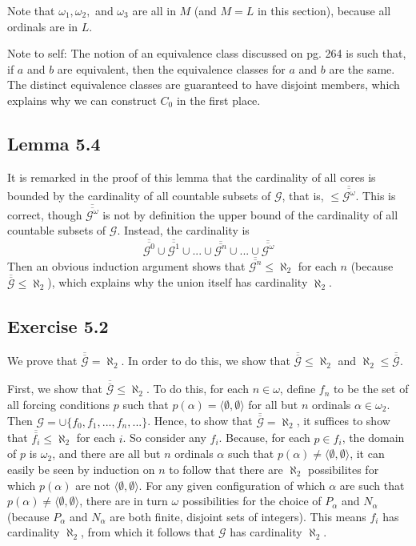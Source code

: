 \documentclass{article}
\theoremstyle{definition}
\begin{document}
Note that $\omega_1,\omega_2,$ and $\omega_3$ are all in $M$ (and $M=L$ in this section), because all ordinals are in 
$L$.

Note to self: The notion of an equivalence class discussed on pg. 264 is such that, if $a$ and $b$ are equivalent, then 
the equivalence classes for $a$ and $b$ are the same. The distinct equivalence classes are guaranteed to have disjoint members, which explains 
why we can construct $C_0$ in the first place.

\subsection*{Lemma 5.4}
It is remarked in the proof of this lemma that the cardinality of all cores is bounded by the cardinality of all countable 
subsets of $\mathcal{G}$, that is, $\le\overline{\overline{\mathcal{G}^\omega}}$. This is correct, though 
$\overline{\overline{\mathcal{G}^\omega}}$ is not by definition the upper bound of the cardinality of all countable subsets of 
$\mathcal{G}$. Instead, the cardinality is
\[ \overline{\overline{\mathcal{G}^0}}\cup\overline{\overline{\mathcal{G}^1}}\cup 
...\cup\overline{\overline{\mathcal{G}^n}}\cup ...\cup\overline{\overline{\mathcal{G}^\omega}} \]
Then an obvious induction argument shows that $\overline{\overline{\mathcal{G}^n}}\le\aleph_2$ for each $n$ (because 
$\overline{\overline{\mathcal{G}}}\le\aleph_2$), which explains why the union itself has cardinality
$\aleph_2$.

\subsection*{Exercise 5.2}
We prove that $\overline{\overline{\mathcal{G}}}=\aleph_2$. In order to do this, we show that 
$\overline{\overline{\mathcal{G}}}\le\aleph_2$ and $\aleph_2\le\overline{\overline{\mathcal{G}}}$. 

First, we show that $\overline{\overline{\mathcal{G}}}\le\aleph_2$. To do this, for each $n\in\omega$, 
define $f_n$ to be the set of all forcing conditions 
$p$ such that $p(\alpha)=\langle\emptyset,\emptyset\rangle$ for all but $n$ ordinals $\alpha\in\omega_2$. Then 
$\mathcal{G}=\cup\{f_0,f_1,...,f_n,...\}$. Hence, to show that $\overline{\overline{\mathcal{G}}}=\aleph_2$, it suffices to show that 
$\overline{\overline{f_i}}\le\aleph_2$ for each $i$. So consider any $f_i$. Because, for each $p\in f_i$, the domain of 
$p$ is $\omega_2$, and there are all but $n$ ordinals $\alpha$ such that $p(\alpha)\ne\langle\emptyset,\emptyset\rangle$, it can easily be seen 
by induction on $n$ to follow that there are $\aleph_2$ possibilites for which $p(\alpha)$ are not $\langle\emptyset,\emptyset\rangle$. 
For any given configuration of which $\alpha$ are such that $p(\alpha)\ne\langle\emptyset,\emptyset\rangle$, there are 
in turn $\omega$ possibilities for the choice of $P_\alpha$ and $N_\alpha$ (because $P_\alpha$ and $N_\alpha$ are both 
finite, disjoint sets of integers). This means $f_i$ has cardinality $\aleph_2$, from which it follows that 
$\mathcal{G}$ has cardinality $\aleph_2$.
\end{document}

